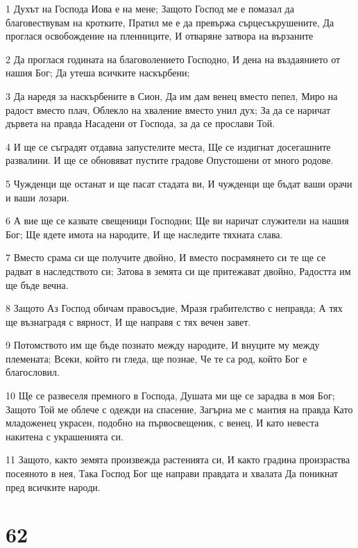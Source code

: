 \par 1 Духът на Господа Иова е на мене; Защото Господ ме е помазал да благовествувам на кротките, Пратил ме е да превържа сърцесъкрушените, Да проглася освобождение на пленниците, И отваряне затвора на вързаните
\par 2 Да проглася годината на благоволението Господно, И дена на въздаянието от нашия Бог; Да утеша всичките наскърбени;
\par 3 Да наредя за наскърбените в Сион, Да им дам венец вместо пепел, Миро на радост вместо плач, Облекло на хваление вместо унил дух; За да се наричат дървета на правда Насадени от Господа, за да се прослави Той.
\par 4 И ще се съградят отдавна запустелите места, Ще се издигнат досегашните развалини. И ще се обновяват пустите градове Опустошени от много родове.
\par 5 Чужденци ще останат и ще пасат стадата ви, И чужденци ще бъдат ваши орачи и ваши лозари.
\par 6 А вие ще се казвате свещеници Господни; Ще ви наричат служители на нашия Бог; Ще ядете имота на народите, И ще наследите тяхната слава.
\par 7 Вместо срама си ще получите двойно, И вместо посрамянето си те ще се радват в наследството си; Затова в земята си ще притежават двойно, Радостта им ще бъде вечна.
\par 8 Защото Аз Господ обичам правосъдие, Мразя грабителство с неправда; А тях ще възнаградя с вярност, И ще направя с тях вечен завет.
\par 9 Потомството им ще бъде познато между народите, И внуците му между племената; Всеки, който ги гледа, ще познае, Че те са род, който Бог е благословил.
\par 10 Ще се развеселя премного в Господа, Душата ми ще се зарадва в моя Бог; Защото Той ме облече с одежди на спасение, Загърна ме с мантия на правда Като младоженец украсен, подобно на първосвещеник, с венец, И като невеста накитена с украшенията си.
\par 11 Защото, както земята произвежда растенията си, И както градина произраства посеяното в нея, Така Господ Бог ще направи правдата и хвалата Да поникнат пред всичките народи.

\chapter{62}

